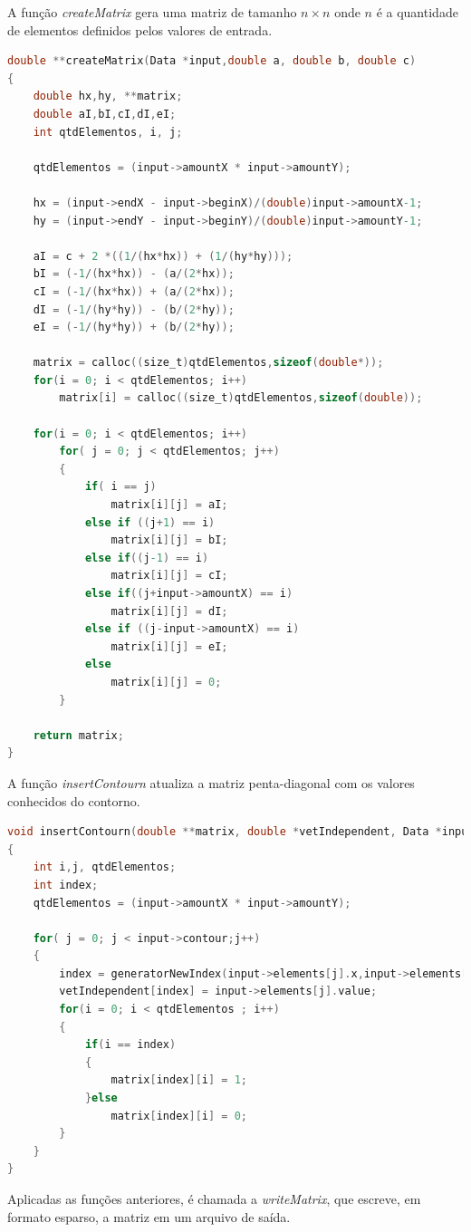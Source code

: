 \documentclass[
	11pt,				%
	oneside,			%
	a4paper,			%
	english,			%
	brazil,				%
	]{article}
\begin{document}
A função \textit{createMatrix} gera uma matriz de tamanho $n \times n$ onde $n$ é a quantidade de elementos definidos pelos valores de entrada.
\begin{lstlisting}[language=C, caption=Função Cria Matriz]
double **createMatrix(Data *input,double a, double b, double c)
{
	double hx,hy, **matrix;
	double aI,bI,cI,dI,eI;
	int qtdElementos, i, j;

	qtdElementos = (input->amountX * input->amountY);

	hx = (input->endX - input->beginX)/(double)input->amountX-1;
	hy = (input->endY - input->beginY)/(double)input->amountY-1;

	aI = c + 2 *((1/(hx*hx)) + (1/(hy*hy)));
	bI = (-1/(hx*hx)) - (a/(2*hx));
	cI = (-1/(hx*hx)) + (a/(2*hx));
	dI = (-1/(hy*hy)) - (b/(2*hy));
	eI = (-1/(hy*hy)) + (b/(2*hy));

	matrix = calloc((size_t)qtdElementos,sizeof(double*));
	for(i = 0; i < qtdElementos; i++)
		matrix[i] = calloc((size_t)qtdElementos,sizeof(double));

	for(i = 0; i < qtdElementos; i++)
		for( j = 0; j < qtdElementos; j++)
		{
			if( i == j)
				matrix[i][j] = aI;
			else if ((j+1) == i)
				matrix[i][j] = bI;
			else if((j-1) == i)
				matrix[i][j] = cI;
			else if((j+input->amountX) == i)
				matrix[i][j] = dI;
			else if ((j-input->amountX) == i)
				matrix[i][j] = eI;
			else
				matrix[i][j] = 0;
		}

	return matrix;
}
\end{lstlisting}

A função \textit{insertContourn} atualiza a matriz penta-diagonal com os valores conhecidos do contorno.
\begin{lstlisting}[language=C, caption=Função Insere Contorno]
void insertContourn(double **matrix, double *vetIndependent, Data *input)
{
	int i,j, qtdElementos;
	int index;
	qtdElementos = (input->amountX * input->amountY);

	for( j = 0; j < input->contour;j++)
	{
		index = generatorNewIndex(input->elements[j].x,input->elements[j].y,input->amountX);
		vetIndependent[index] = input->elements[j].value;
		for(i = 0; i < qtdElementos ; i++)
		{
			if(i == index)
			{
				matrix[index][i] = 1;
			}else
				matrix[index][i] = 0;
		}
	}
}
\end{lstlisting}

Aplicadas as funções anteriores, é chamada a \textit{writeMatrix}, que escreve, em formato esparso, a matriz em um arquivo de saída.
\end{document}
